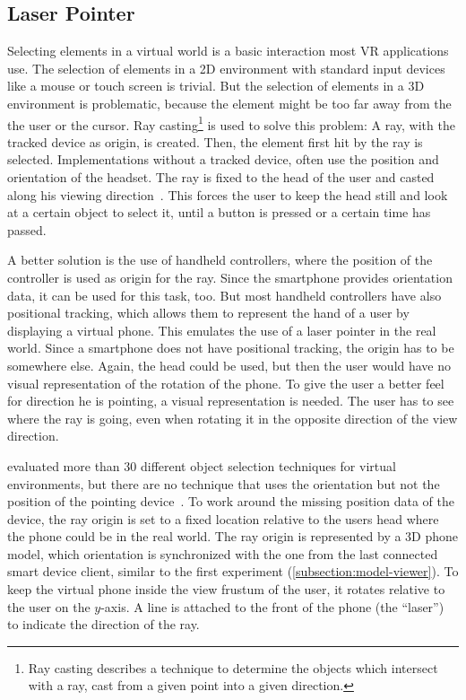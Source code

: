 \subsection{Laser Pointer}\label{subsection:laser-pointer}

Selecting elements in a virtual world is a basic interaction most \ac{VR} applications use. The selection of elements in a \ac{2D} environment with standard input devices like a mouse or touch screen is trivial. But the selection of elements in a \ac{3D} environment is problematic, because the element might be too far away from the the user or the cursor. Ray casting\footnote{Ray casting describes a technique to determine the objects which intersect with a ray, cast from a given point into a given direction.} is used to solve this problem: A ray, with the tracked device as origin, is created. Then, the element first hit by the ray is selected. Implementations without a tracked device, often use the position and orientation of the headset. The ray is fixed to the head of the user and casted along his viewing direction~\cite[23]{Kamm.2018}. This forces the user to keep the head still and look at a certain object to select it, until a button is pressed or a certain time has passed.

A better solution is the use of handheld controllers, where the position of the controller is used as origin for the ray. Since the smartphone provides orientation data, it can be used for this task, too. But most handheld controllers have also positional tracking, which allows them to represent the hand of a user by displaying a virtual phone. This emulates the use of a laser pointer in the real world. Since a smartphone does not have positional tracking, the origin has to be somewhere else. Again, the head could be used, but then the user would have no visual representation of the rotation of the phone. To give the user a better feel for direction he is pointing, a visual representation is needed. The user has to see where the ray is going, even when rotating it in the opposite direction of the view direction.

\citeauthor{Argelaguet.2013} evaluated more than 30 different object selection techniques for virtual environments, but there are no technique that uses the orientation but not the position of the pointing device~\cite[Table 1]{Argelaguet.2013}. To work around the missing position data of the device, the ray origin is set to a fixed location relative to the users head where the phone could be in the real world. The ray origin is represented by a \ac{3D} phone model, which orientation is synchronized with the one from the last connected smart device client, similar to the first experiment (\ref{subsection:model-viewer}). To keep the virtual phone inside the view frustum of the user, it rotates relative to the user on the \(y\)-axis.
A line is attached to the front of the phone (the \enquote{laser}) to indicate the direction of the ray.

